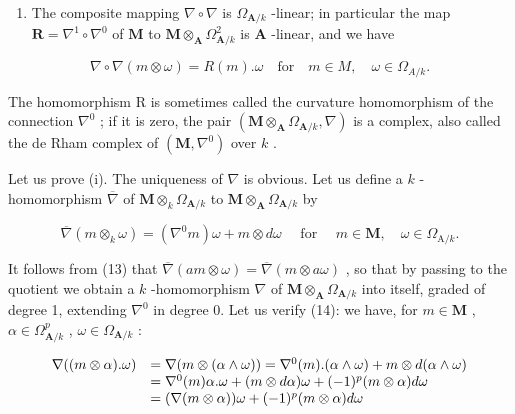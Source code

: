 \begin{enumerate}
\def\labelenumi{(\roman{enumi})}
\setcounter{enumi}{1}
\tightlist
\item
  The composite mapping \(\nabla \circ \nabla\) is \(\Omega_{\mathbf{A} / k}\) -linear; in particular the map \(\mathbf{R} = \nabla^{1} \circ \nabla^{0}\) of \(\mathbf{M}\) to \(\mathbf{M} \otimes_{\mathbf{A}} \Omega_{\mathbf{A} / k}^{2}\) is \(\mathbf{A}\) -linear, and we have
\end{enumerate}

\[
\nabla \circ \nabla (m \otimes \omega) = R (m). \omega \quad \mathrm{for} \quad m \in M, \quad \omega \in \Omega_ {A / k}.
\]

The homomorphism R is sometimes called the curvature homomorphism of the connection \(\nabla^{0}\) ; if it is zero, the pair \((\mathbf{M} \otimes_{\mathbf{A}} \Omega_{\mathbf{A}/k}, \nabla)\) is a complex, also called the de Rham complex of \((\mathbf{M}, \nabla^{0})\) over \(k\) .

Let us prove (i). The uniqueness of \(\nabla\) is obvious. Let us define a \(k\) -homomorphism \(\overline{\nabla}\) of \(\mathbf{M} \otimes_k \Omega_{\mathbf{A}/k}\) to \(\mathbf{M} \otimes_{\mathbf{A}} \Omega_{\mathbf{A}/k}\) by

\[
\overline {{{\nabla}}} (m \otimes_ {k} \omega) = (\nabla^ {0} m) \omega + m \otimes d \omega \quad \text { for } \quad m \in \mathbf {M}, \quad \omega \in \Omega_ {\mathrm{A} / k}.
\]

It follows from (13) that \(\overline{\nabla}(am \otimes \omega) = \overline{\nabla}(m \otimes a\omega)\) , so that by passing to the quotient we obtain a \(k\) -homomorphism \(\nabla\) of \(\mathbf{M} \otimes_{\mathbf{A}} \Omega_{\mathbf{A}/k}\) into itself, graded of degree 1, extending \(\nabla^{0}\) in degree 0. Let us verify (14): we have, for \(m \in \mathbf{M}\) , \(\alpha \in \Omega_{\mathbf{A}/k}^{p}\) , \(\omega \in \Omega_{\mathbf{A}/k}\) :

\[
\begin{array}{r l} \nabla ((m \otimes \alpha). \omega) & = \nabla (m \otimes (\alpha \wedge \omega)) = \nabla^ {0} (m). (\alpha \wedge \omega) + m \otimes d (\alpha \wedge \omega) \\ & = \nabla^ {0} (m) \alpha . \omega + (m \otimes d \alpha) \omega + (- 1) ^ {p} (m \otimes \alpha) d \omega \\ & = (\nabla (m \otimes \alpha)) \omega + (- 1) ^ {p} (m \otimes \alpha) d \omega \end{array}
\]

